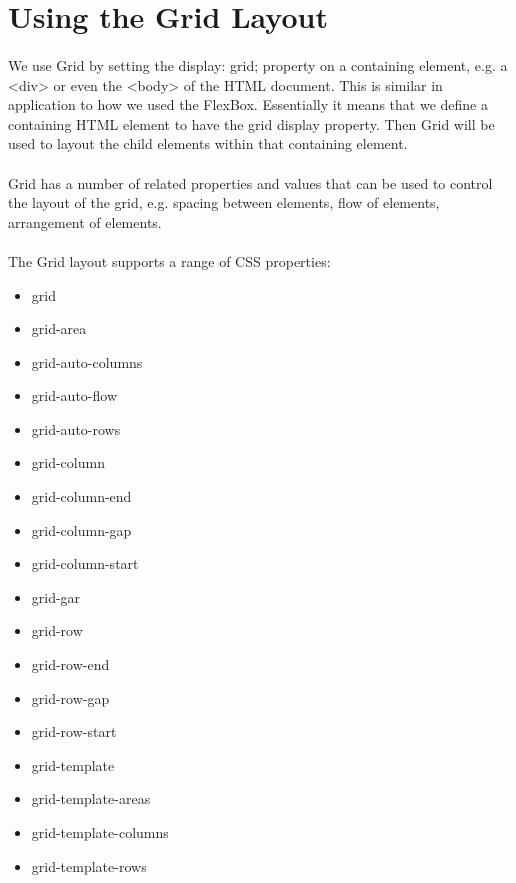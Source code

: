\section{Using the Grid Layout}
\paragraph{} We use Grid by setting the display: grid; property on a containing element, e.g. a <div> or even the <body> of the HTML document. This is similar in application to how we used the FlexBox. Essentially it means that we define a containing HTML element to have the grid display property. Then Grid will be used to layout the child elements within that containing element.
\paragraph{} Grid has a number of related properties and values that can be used to control the layout of the grid, e.g. spacing between elements, flow of elements, arrangement of elements.

\paragraph{} The Grid layout supports a range of CSS properties:

\begin{itemize}
\item grid
\item grid-area
\item grid-auto-columns
\item grid-auto-flow
\item grid-auto-rows
\item grid-column
\item grid-column-end
\item grid-column-gap
\item grid-column-start
\item grid-gar
\item grid-row
\item grid-row-end
\item grid-row-gap
\item grid-row-start
\item grid-template
\item grid-template-areas
\item grid-template-columns
\item grid-template-rows
\end{itemize}

